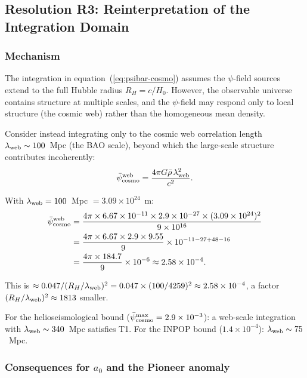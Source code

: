 \documentclass[aps,prd,twocolumn,superscriptaddress,nofootinbib,longbibliography]{revtex4-2}
\newcommand{\psibar}{\bar{\psi}}
\newcommand{\ee}[1]{\times 10^{#1}}
\begin{document}
\subsection{Resolution R3: Reinterpretation of the Integration Domain}
\label{sec:R3}

\subsubsection{Mechanism}

The integration in equation~(\ref{eq:psibar-cosmo}) assumes the $\psi$-field
sources extend to the full Hubble radius $R_H = c/H_0$.  However, the
observable universe contains structure at multiple scales, and the
$\psi$-field may respond only to local structure (the cosmic web) rather
than the homogeneous mean density.

Consider instead integrating only to the cosmic web correlation length
$\lambda_{\rm web} \sim 100$~Mpc (the BAO scale), beyond which the
large-scale structure contributes incoherently:
\begin{equation}
\psibar_{\rm cosmo}^{\rm web} = \frac{4\pi G\bar{\rho}\,\lambda_{\rm web}^2}{c^2}.
\label{eq:psibar-web}
\end{equation}

With $\lambda_{\rm web} = 100$~Mpc $= 3.09\ee{24}$~m:
\begin{align}
\psibar_{\rm cosmo}^{\rm web}
&= \frac{4\pi\times 6.67\ee{-11}\times 2.9\ee{-27}\times(3.09\ee{24})^2}{9\ee{16}}\nonumber\\
&= \frac{4\pi\times 6.67\times 2.9\times 9.55}{9}\ee{-11-27+48-16}\nonumber\\
&= \frac{4\pi\times 184.7}{9}\ee{-6} \approx 2.58\ee{-4}.
\label{eq:psibar-web-num}
\end{align}

This is $\approx 0.047/(R_H/\lambda_{\rm web})^2 = 0.047\times(100/4259)^2 \approx
2.58\ee{-4}$, a factor $(R_H/\lambda_{\rm web})^2 \approx 1813$ smaller.

For the helioseismological bound ($\psibar_{\rm cosmo}^{\rm max} = 2.9\ee{-3}$):
a web-scale integration with $\lambda_{\rm web} \sim 340$~Mpc satisfies T1.
For the INPOP bound ($1.4\ee{-4}$): $\lambda_{\rm web} \sim 75$~Mpc.

\subsubsection{Consequences for $a_0$ and the Pioneer anomaly}
\end{document}
